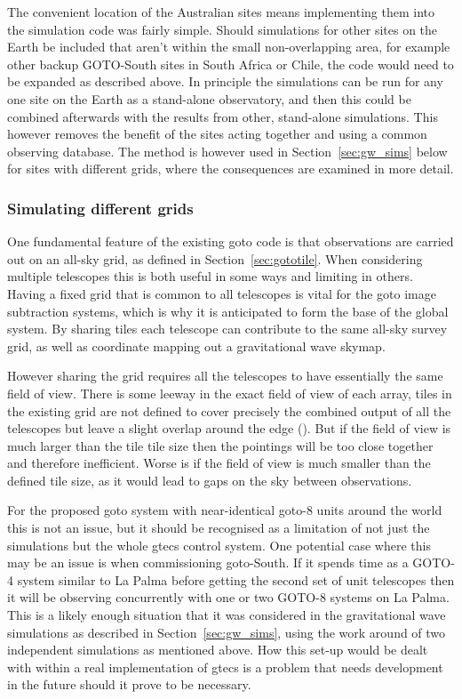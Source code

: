 \begin{colsection}
\begin{colsection}
\clearpage

The convenient location of the Australian sites means implementing them into the simulation code was fairly simple. Should simulations for other sites on the Earth be included that aren't within the small non-overlapping area, for example other backup GOTO-South sites in South Africa or Chile, the code would need to be expanded as described above. In principle the simulations can be run for any one site on the Earth as a stand-alone observatory, and then this could be combined afterwards with the results from other, stand-alone simulations. This however removes the benefit of the sites acting together and using a common observing database. The method is however used in Section~\ref{sec:gw_sims} below for sites with different grids, where the consequences are examined in more detail.

\subsubsection{Simulating different grids}

One fundamental feature of the existing \gls{goto} code is that observations are carried out on an all-sky grid, as defined in Section~\ref{sec:gototile}. When considering multiple telescopes this is both useful in some ways and limiting in others. Having a fixed grid that is common to all telescopes is vital for the \gls{goto} image subtraction systems, which is why it is anticipated to form the base of the global system. By sharing tiles each telescope can contribute to the same all-sky survey grid, as well as coordinate mapping out a gravitational wave skymap.

However sharing the grid requires all the telescopes to have essentially the same field of view. There is some leeway in the exact field of view of each array, tiles in the existing grid are not defined to cover precisely the combined output of all the telescopes but leave a slight overlap around the edge (). But if the field of view is much larger than the tile tile size then the pointings will be too close together and therefore inefficient. Worse is if the field of view is much smaller than the defined tile size, as it would lead to gaps on the sky between observations.

For the proposed \gls{goto} system with near-identical \gls{goto}-8 units around the world this is not an issue, but it should be recognised as a limitation of not just the simulations but the whole \gls{gtecs} control system. One potential case where this may be an issue is when commissioning \gls{goto}-South. If it spends time as a GOTO-4 system similar to La Palma before getting the second set of unit telescopes then it will be observing concurrently with one or two GOTO-8 systems on La Palma. This is a likely enough situation that it was considered in the gravitational wave simulations as described in Section~\ref{sec:gw_sims}, using the work around of two independent simulations as mentioned above. How this set-up would be dealt with within a real implementation of \gls{gtecs} is a problem that needs development in the future should it prove to be necessary.


\end{colsection}
\end{colsection}
